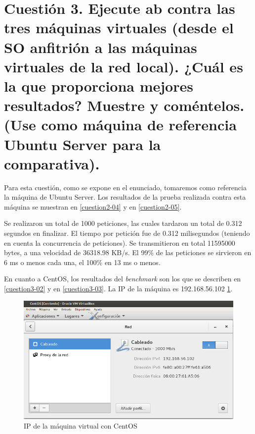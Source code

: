 \section{Cuestión 3. Ejecute ab contra las tres máquinas virtuales (desde el SO anfitrión a las máquinas virtuales de la red local). ¿Cuál es la que proporciona mejores resultados? Muestre y coméntelos. (Use como máquina de referencia Ubuntu Server para la comparativa).}

Para esta cuestión, como se expone en el enunciado, tomaremos como referencia la máquina de Ubuntu Server. Los resultados de la prueba realizada contra esta máquina se muestran en \ref{cuestion2-04} y en \ref{cuestion2-05}.

Se realizaron un total de 1000 peticiones, las cuales tardaron un total de 0.312 segundos en finalizar. El tiempo por petición fue de 0.312 milisegundos (teniendo en cuenta la concurrencia de peticiones). Se transmitieron en total 11595000 bytes, a una velocidad de 36318.98 KB/s.
El 99\% de las peticiones se sirvieron en 6 ms o menos cada una, el 100\% en 13 ms o menos.

En cuanto a CentOS, los resultados del \textit{benchmark} son los que se describen en \ref{cuestion3-02} y en \ref{cuestion3-03}.
La IP de la máquina es 192.168.56.102 \ref{cuestion3-01}.

\begin{figure}[H]
	\centering
	\includegraphics[scale=0.6]{cuestion3-01.png}
	\caption{IP de la máquina virtual con CentOS} \label{cuestion3-01}
\end{figure}

